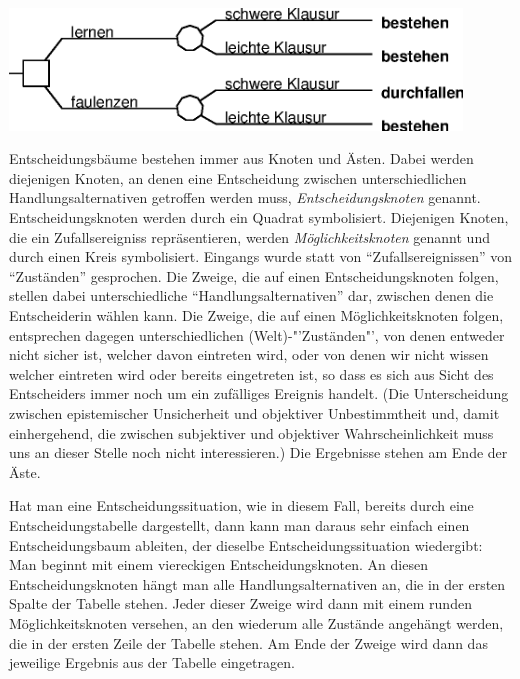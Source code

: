 \begin{center} 
\includegraphics[width=12cm]{Grafiken/Beispiel1_1.eps}
\end{center}

Entscheidungsbäume bestehen immer aus Knoten und Ästen.
 Dabei werden die\-jenigen Knoten, an denen
eine Entscheidung zwischen unterschiedlichen Handlungsalternativen
getroffen werden muss, {\em Entscheidungs\-knoten}
genannt. Entscheidungsknoten werden durch ein Quadrat
symbolisiert. Diejenigen Knoten, die ein Zufallsereigniss
repräsentieren, werden {\em Möglichkeits\-knoten} genannt und durch
einen Kreis symbolisiert. Eingangs wurde statt von
"`Zufallsereignissen"' von "`Zuständen"' gesprochen. Die Zweige, die
auf einen Entscheidungsknoten folgen, stellen dabei unterschiedliche
"`Handlungsalternativen"' dar, zwischen denen die Entscheiderin wählen
kann.  Die Zweige, die auf einen Möglichkeitsknoten folgen,
entsprechen dagegen unterschiedlichen (Welt)-"'Zuständen"', von denen
entweder nicht sicher ist, welcher davon eintreten wird, oder von
denen wir nicht wissen welcher eintreten wird oder bereits eingetreten
ist, so dass es sich aus Sicht des Entscheiders immer noch um ein
zufälliges Ereignis handelt. (Die Unterscheidung zwischen
epistemischer Unsicherheit und objektiver Unbestimmtheit und, damit
einhergehend, die zwischen subjektiver und objektiver
Wahrscheinlichkeit muss uns an dieser Stelle noch nicht
interessieren.) Die Ergebnisse stehen am Ende der Äste.

 Hat man eine
Entscheidungssituation, wie in diesem Fall, bereits durch eine
Entscheidungstabelle dargestellt, dann kann man daraus sehr einfach
einen Entscheidungsbaum ableiten, der dieselbe Entscheidungssituation
wiedergibt: Man beginnt mit einem viereckigen Entscheidungsknoten. An
diesen Entscheidungsknoten hängt man alle Handlungsalternativen an,
die in der ersten Spalte der Tabelle stehen. Jeder dieser Zweige wird
dann mit einem runden Möglichkeitsknoten versehen, an den wiederum
alle Zustände angehängt werden, die in der ersten Zeile der Tabelle
stehen. Am Ende der Zweige wird dann das jeweilige Ergebnis aus der
Tabelle eingetragen.

